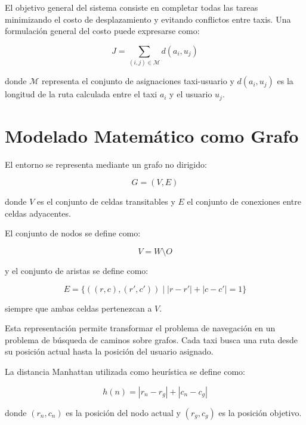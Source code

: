 \documentclass[12pt,a4paper]{article}
\begin{document}
El objetivo general del sistema consiste en completar todas las tareas minimizando el costo de desplazamiento y evitando conflictos entre taxis. Una formulación general del costo puede expresarse como:

\begin{equation}
J = \sum_{(i,j)\in \mathcal{M}} d(a_i,u_j)
\end{equation}

donde $\mathcal{M}$ representa el conjunto de asignaciones taxi-usuario y $d(a_i,u_j)$ es la longitud de la ruta calculada entre el taxi $a_i$ y el usuario $u_j$.

\section{Modelado Matemático como Grafo}
\justifying

El entorno se representa mediante un grafo no dirigido:

\begin{equation}
G = (V,E)
\end{equation}

donde $V$ es el conjunto de celdas transitables y $E$ el conjunto de conexiones entre celdas adyacentes.

El conjunto de nodos se define como:

\begin{equation}
V = W \setminus O
\end{equation}

y el conjunto de aristas se define como:

\begin{equation}
E = \{((r,c),(r',c')) \mid |r-r'| + |c-c'| = 1\}
\end{equation}

siempre que ambas celdas pertenezcan a $V$.

Esta representación permite transformar el problema de navegación en un problema de búsqueda de caminos sobre grafos. Cada taxi busca una ruta desde su posición actual hasta la posición del usuario asignado.

La distancia Manhattan utilizada como heurística se define como:

\begin{equation}
h(n) = |r_n-r_g| + |c_n-c_g|
\end{equation}

donde $(r_n,c_n)$ es la posición del nodo actual y $(r_g,c_g)$ es la posición objetivo.
\end{document}
